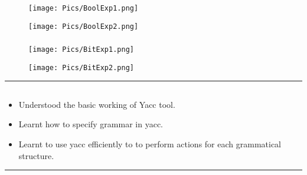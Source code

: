 \documentclass[12pt,letterpaper]{article}
\begin{document}
\newpage
\subsubsection*{}
\begin{figure}[h]
    \centering
    \texttt{[image: Pics/BoolExp1.png]}
\end{figure}
\begin{figure}[h]
    \centering
    \texttt{[image: Pics/BoolExp2.png]}
\end{figure}

\newpage
\subsubsection*{}
\begin{figure}[h]
    \centering
    \texttt{[image: Pics/BitExp1.png]}
\end{figure}
\begin{figure}[h]
    \centering
    \texttt{[image: Pics/BitExp2.png]}
\end{figure}
\hrule
\subsection*{}
\begin{flushleft}
    \renewcommand{\labelitemi}{$\textendash$}
    \begin{itemize}
        \item Understood the basic working of Yacc tool. 
        \item Learnt how to specify grammar in yacc.
        \item Learnt to use yacc efficiently to to perform actions for each grammatical structure.
    \end{itemize}
\end{flushleft}
\hrule
\end{document}
